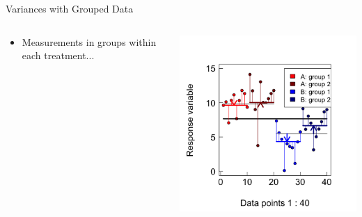 \documentclass{beamer}
\begin{document}
\begin{frame}{Variances with Grouped Data}
  \begin{columns}[onlytextwidth] %
    \begin{column}{0.54\textwidth}
  \begin{itemize}
    \item Measurements in groups within each treatment...
  \end{itemize}    \end{column}
    \hspace{0.02\textwidth} %
    \begin{column}{0.46\textwidth}
      \begin{center}
        \includegraphics[width=0.999\textwidth]{lectures/day_1_intro_to_mems/figures/unnamed-chunk-31-1.png}
      \end{center}
    \end{column}
  \end{columns}
\end{frame}
\end{document}

